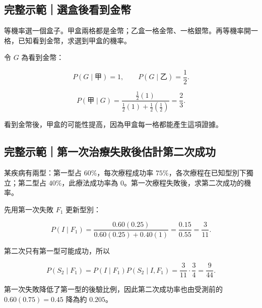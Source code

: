 \documentclass[11pt,a4paper]{article}
\begin{document}
\begin{HandoutWorkedExample}

\subsection{完整示範｜選盒後看到金幣}\label{ux5b8cux6574ux793aux7bc4ux9078ux76d2ux5f8cux770bux5230ux91d1ux5e63}

等機率選一個盒子。甲盒兩格都是金幣；乙盒一格金幣、一格銀幣。再等機率開一格，已知看到金幣，求選到甲盒的機率。

令 \(G\) 為看到金幣：

\[
P(G\mid \text{甲})=1,
\qquad
P(G\mid \text{乙})=\frac12.
\]

\[
P(\text{甲}\mid G)
=\frac{\frac12(1)}{\frac12(1)+\frac12(\frac12)}
=\boxed{\frac23}.
\]

看到金幣後，甲盒的可能性提高，因為甲盒每一格都能產生這項證據。

\end{HandoutWorkedExample}

\begin{HandoutWorkedExample}

\subsection{完整示範｜第一次治療失敗後估計第二次成功}\label{ux5b8cux6574ux793aux7bc4ux7b2cux4e00ux6b21ux6cbbux7642ux5931ux6557ux5f8cux4f30ux8a08ux7b2cux4e8cux6b21ux6210ux529f}

某疾病有兩型：第一型占 \(60\%\)，每次療程成功率 \(75\%\)，各次療程在已知型別下獨立；第二型占 \(40\%\)，此療法成功率為 \(0\)。第一次療程失敗後，求第二次成功的機率。

先用第一次失敗 \(F_1\) 更新型別：

\[
P(I\mid F_1)
=\frac{0.60(0.25)}{0.60(0.25)+0.40(1)}
=\frac{0.15}{0.55}
=\frac3{11}.
\]

第二次只有第一型可能成功，所以

\[
P(S_2\mid F_1)
=P(I\mid F_1)P(S_2\mid I,F_1)
=\frac3{11}\cdot\frac34
=\boxed{\frac9{44}}.
\]

第一次失敗降低了第一型的後驗比例，因此第二次成功率也由受測前的 \(0.60(0.75)=0.45\) 降為約 \(0.205\)。

\end{HandoutWorkedExample}
\end{document}
